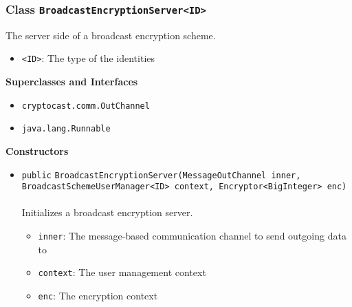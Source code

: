 \subsubsection{Class \lstinline|BroadcastEncryptionServer<ID>|}
The server side of a broadcast encryption scheme. \\
\noindent\begin{minipage}[t]{5cm}
\vspace{0.3em}
\hspace*{2em}
\vspace{0.3em}
\end{minipage}

\begin{itemize}
\item \lstinline|<ID>|: The type of the identities
\end{itemize}


\textbf{\sffamily Superclasses and Interfaces}
\begin{itemize}
\item \lstinline|cryptocast.comm.OutChannel|
\item \lstinline|java.lang.Runnable|
\end{itemize}


\textbf{\sffamily Constructors}
\begin{itemize}
\item \lstinline|public| \lstinline|BroadcastEncryptionServer|\lstinline|(MessageOutChannel inner, BroadcastSchemeUserManager<ID> context, Encryptor<BigInteger> enc)|\\ \\[-0.6em]
Initializes a broadcast encryption server.
\begin{itemize}
\item \lstinline|inner|: The message-based communication channel to send outgoing data to
\item \lstinline|context|: The user management context
\item \lstinline|enc|: The encryption context
\end{itemize}



\end{itemize}


